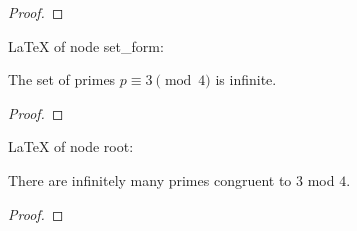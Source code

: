 \begin{proof}
\leanok
\end{proof}
LaTeX of node set_form:
\begin{theorem}
\label{set_form}
\leanok
The set of primes $p \equiv 3 \pmod 4$ is infinite.
\end{theorem}
\begin{proof}
\leanok
\end{proof}
LaTeX of node root:
\begin{theorem}
\label{root}
\leanok
There are infinitely many primes congruent to $3$ mod $4$.
\end{theorem}
\begin{proof}
\leanok
\end{proof}
